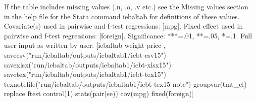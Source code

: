 If the table includes missing values (.n, .o, .v etc.) see the Missing values section in the help file for the Stata command iebaltab for definitions of these values. Covariate(s) used in pairwise and f-test regressions: [mpg]. Fixed effect used in pairwise and f-test regressions: [foreign]. Significance: ***=.01, **=.05, *=.1. Full user input as written by user: [iebaltab weight price , savecsv("run/iebaltab/outputs/iebaltab1/iebt-csv15") savexlsx("run/iebaltab/outputs/iebaltab1/iebt-xlsx15") savetex("run/iebaltab/outputs/iebaltab1/iebt-tex15") texnotefile("run/iebaltab/outputs/iebaltab1/iebt-tex15-note") groupvar(tmt\_cl) replace ftest control(1) stats(pair(se)) cov(mpg) fixed(foreign)] 
